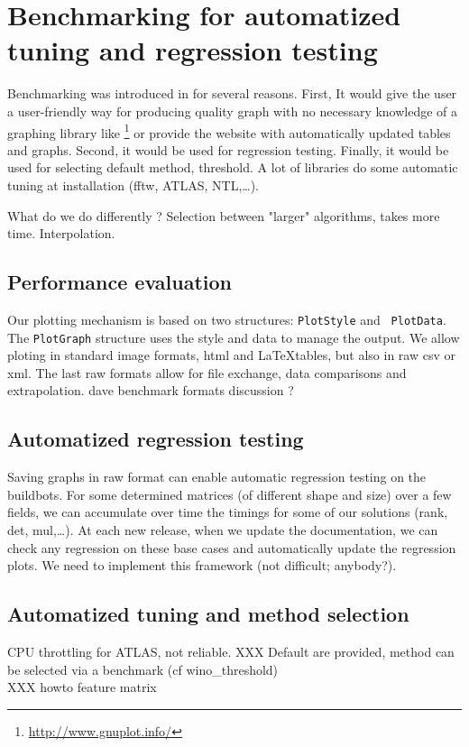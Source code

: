 \section{Benchmarking  for automatized tuning and regression testing}\label{sec:bench}
%
Benchmarking was introduced in \linbox for several reasons. First, It would
give the user a user-friendly way for producing quality graph with no necessary
knowledge of a graphing library like \gnuplot%
%
%
\footnote{\url{http://www.gnuplot.info/}}
%
or provide the \linbox website with automatically updated tables and graphs.
Second, it would be used for regression testing.  Finally, it would be used for
selecting default method, threshold. A lot of libraries do some automatic tuning
at installation (fftw, ATLAS, NTL,\ldots).
%
\par
%
What do we do differently ? Selection between "larger" algorithms, takes more time.
Interpolation.
%
%
\subsection{Performance evaluation}
%
Our plotting mechanism is based on two structures: {\tt PlotStyle} and {\tt
PlotData}. The  {\tt PlotGraph} structure uses the style and data to manage the
output.  We allow ploting in standard image formats, html and \LaTeX tables,
but also in raw csv or xml. The last raw formats allow for file exchange, data
comparisons and extrapolation.
\danger dave benchmark formats discussion ?
%
\par
%
% 
%
%
\subsection{Automatized regression testing}
%
Saving graphs in raw format can enable automatic regression testing on the
buildbots. For some determined matrices (of different shape and size) over a
few fields, we can accumulate over time the timings for some of our solutions
(rank, det, mul,\ldots). At each new release, when we update the documentation,
we can check any regression on these base cases and automatically update the
regression plots.
\danger We need to implement this framework (not difficult; anybody?).
%
\subsection{Automatized tuning and method selection}
%
CPU throttling for ATLAS, \fflasffpack not reliable.
XXX Default are provided, method can be selected via a benchmark (cf wino\_threshold)\\
XXX howto
feature matrix
